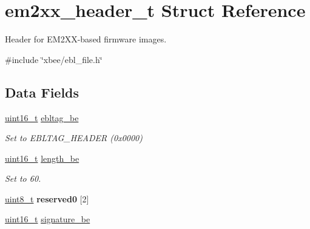 \hypertarget{structem2xx__header__t}{\section{em2xx\-\_\-header\-\_\-t Struct Reference}
\label{structem2xx__header__t}
}


Header for E\-M2\-X\-X-\/based firmware images.  




{\ttfamily \#include \char`\"{}xbee/ebl\-\_\-file.\-h\char`\"{}}

\subsection*{Data Fields}
\begin{DoxyCompactItemize}
\item 
\hypertarget{structem2xx__header__t_a7de4514a713d8a42dd9d4749d775a0ef}{\hyperlink{group__hal_ga5a8b2dc9e45a9ee81a94ef304fb62505}{uint16\-\_\-t} \hyperlink{structem2xx__header__t_a7de4514a713d8a42dd9d4749d775a0ef}{ebltag\-\_\-be}}\label{structem2xx__header__t_a7de4514a713d8a42dd9d4749d775a0ef}

\begin{DoxyCompactList}\small\item\em Set to E\-B\-L\-T\-A\-G\-\_\-\-H\-E\-A\-D\-E\-R (0x0000) \end{DoxyCompactList}\item 
\hypertarget{structem2xx__header__t_a44c1c906129a1b8f619154f42c31d706}{\hyperlink{group__hal_ga5a8b2dc9e45a9ee81a94ef304fb62505}{uint16\-\_\-t} \hyperlink{structem2xx__header__t_a44c1c906129a1b8f619154f42c31d706}{length\-\_\-be}}\label{structem2xx__header__t_a44c1c906129a1b8f619154f42c31d706}

\begin{DoxyCompactList}\small\item\em Set to 60. \end{DoxyCompactList}\item 
\hypertarget{structem2xx__header__t_ab35e7390856a7af3a72090b906c5136a}{\hyperlink{group__hal_gae1affc9ca37cfb624959c866a73f83c2}{uint8\-\_\-t} {\bfseries reserved0} \mbox{[}2\mbox{]}}\label{structem2xx__header__t_ab35e7390856a7af3a72090b906c5136a}

\item 
\hypertarget{structem2xx__header__t_ab20e78cfd004b348162a62ebe3689514}{\hyperlink{group__hal_ga5a8b2dc9e45a9ee81a94ef304fb62505}{uint16\-\_\-t} \hyperlink{structem2xx__header__t_ab20e78cfd004b348162a62ebe3689514}{signature\-\_\-be}}\label{structem2xx__header__t_ab20e78cfd004b348162a62ebe3689514}


\end{DoxyCompactItemize}
